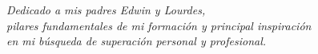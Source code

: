 \chapter*{}
\begin{flushright}
\textit{Dedicado a mis padres Edwin y Lourdes, \\
pilares fundamentales de mi formación y principal inspiración \\
en mi búsqueda de superación personal y profesional.}
\end{flushright}
